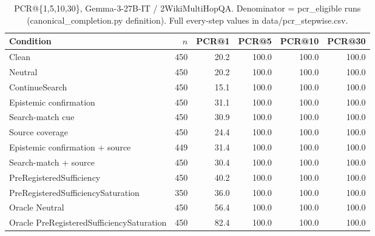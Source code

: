 \begin{table}[t]
\centering
\caption{PCR@\{1,5,10,30\}, Gemma-3-27B-IT / 2WikiMultiHopQA. Denominator = pcr\_eligible runs (canonical\_completion.py definition). Full every-step values in data/pcr_stepwise.csv.}
\begin{tabular}{lrrrrr}
\toprule
Condition & $n$ & PCR@1 & PCR@5 & PCR@10 & PCR@30 \\
\midrule
Clean & 450 & 20.2 & 100.0 & 100.0 & 100.0 \\
Neutral & 450 & 20.2 & 100.0 & 100.0 & 100.0 \\
ContinueSearch & 450 & 15.1 & 100.0 & 100.0 & 100.0 \\
Epistemic confirmation & 450 & 31.1 & 100.0 & 100.0 & 100.0 \\
Search-match cue & 450 & 30.9 & 100.0 & 100.0 & 100.0 \\
Source coverage & 450 & 24.4 & 100.0 & 100.0 & 100.0 \\
Epistemic confirmation + source & 449 & 31.4 & 100.0 & 100.0 & 100.0 \\
Search-match + source & 450 & 30.4 & 100.0 & 100.0 & 100.0 \\
PreRegisteredSufficiency & 450 & 40.2 & 100.0 & 100.0 & 100.0 \\
PreRegisteredSufficiencySaturation & 350 & 36.0 & 100.0 & 100.0 & 100.0 \\
Oracle Neutral & 450 & 56.4 & 100.0 & 100.0 & 100.0 \\
Oracle PreRegisteredSufficiencySaturation & 450 & 82.4 & 100.0 & 100.0 & 100.0 \\
\bottomrule
\end{tabular}
\end{table}

